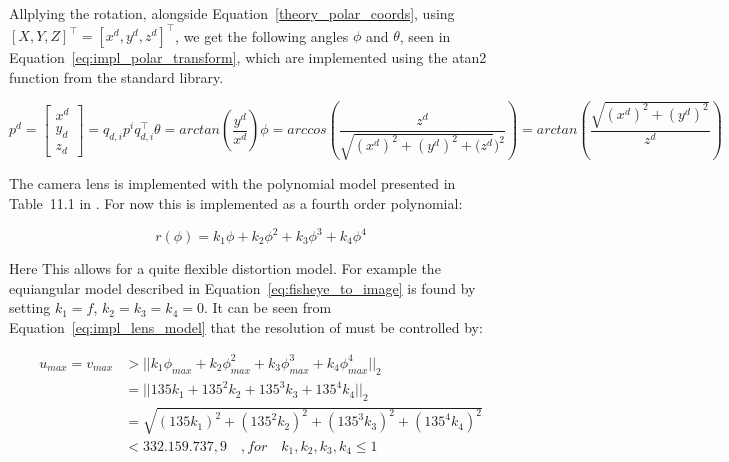 Allplying the rotation, alongside Equation~\eqref{theory_polar_coords}, using $[X,Y,Z]^\top=[x^d,y^d,z^d]^\top$, we get the following angles $\phi$ and $\theta$, seen in Equation~\eqref{eq:impl_polar_transform}, which are implemented using the atan2 function from the standard library.

\begin{subequations}
    \begin{equation}
        p^d = \begin{bmatrix} x^d \\ y_d \\ z_d \end{bmatrix} = q_{d,i} p^i q_{d,i}^\top
        \label{eq:impl_polar_transform_quaternion}
    \end{equation}
    \begin{equation}
        \theta = arctan\left(\frac{y^d}{x^d}\right)
        \label{eq:impl_polar_transform_theta}
    \end{equation}
    \begin{equation}
        \phi = arccos\left(\frac{z^d}{\sqrt{(x^d)^2 + (y^d)^2 + (z^d})^2}\right) = arctan\left(\frac{\sqrt{(x^d)^2 + (y^d)^2}}{z^d}\right)
        \label{eq:impl_polar_transform_phi}
    \end{equation}
    \label{eq:impl_polar_transform}
\end{subequations}


The camera lens is implemented with the polynomial model presented in Table~11.1 in \cite{FisheyeCorke}. For now this is implemented as a fourth order polynomial:

\begin{equation}
    r(\phi) = k_1 \phi + k_2 \phi^2 + k_3 \phi^3 + k_4 \phi^4
    \label{eq:impl_lens_model}
\end{equation}

Here This allows for a quite flexible distortion model. For example the equiangular model described in Equation~\eqref{eq:fisheye_to_image} is found by setting $k_1 = f$, $k_2 = k_3 = k_4 = 0$. It can be seen from Equation~\eqref{eq:impl_lens_model} that the resolution of must be controlled by:

\begin{equation}
    \begin{aligned}
        u_{max} = v_{max} &> ||k_1 \phi_{max} + k_2 \phi_{max}^2 + k_3 \phi_{max}^3 + k_4 \phi_{max}^4 ||_2 \\
        &= || 135k_1 + 135^2 k_2 + 135^3 k_3 + 135^4 k_4 ||_2 \\
        &= \sqrt{(135k_1)^2 + (135^2 k_2)^2 + (135^3 k_3)^2 + (135^4 k_4)^2} \\
        &< 332.159.737,9 \quad, for \quad k_1,k_2,k_3,k_4 \leq 1 
    \end{aligned}
    \label{eq:impl_size_criteria}
\end{equation}

